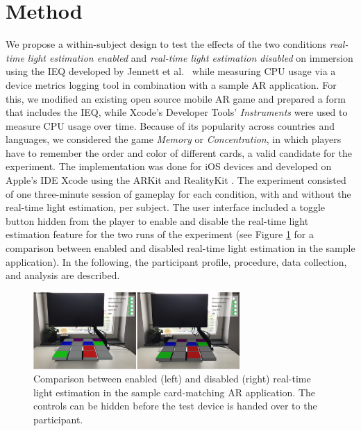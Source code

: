 \documentclass[12pt,twoside,english]{article}
\begin{document}
\section{Method}
\label{sect:method}

We propose a within-subject design to test the effects of the two conditions \textit{real-time light estimation enabled} and \textit{real-time light estimation disabled} on immersion using the \gls{IEQ} developed by Jennett et al.~\cite{jennett_measuring_2008} while measuring \gls{CPU} usage via a device metrics logging tool in combination with a sample \gls{AR} application.
For this, we modified an existing open source mobile \gls{AR} game and prepared a form that includes the \gls{IEQ}, while Xcode's Developer Tools' \textit{Instruments} were used to measure \gls{CPU} usage over time.
Because of its popularity across countries and languages, we considered the game \textit{Memory} or \textit{Concentration}, in which players have to remember the order and color of different cards, a valid candidate for the experiment.
The implementation was done for iOS devices and developed on Apple's \gls{IDE} Xcode using the ARKit and RealityKit .
The experiment consisted of one three-minute session of gameplay for each condition, with and without the real-time light estimation, per subject.
The user interface included a toggle button hidden from the player to enable and disable the real-time light estimation feature for the two runs of the experiment (see Figure \ref{fig:sample_app_comparison} for a comparison between enabled and disabled real-time light estimation in the sample application).
In the following, the participant profile, procedure, data collection, and analysis are described.

\begin{figure}[h]
    \centering
    \includegraphics[width=0.7\textwidth]{imgs/sample_app_comparison.png}
    \caption{Comparison between enabled (left) and disabled (right) real-time light estimation in the sample card-matching \gls{AR} application. The controls can be hidden before the test device is handed over to the participant.}
    \label{fig:sample_app_comparison}
\end{figure}
\end{document}
